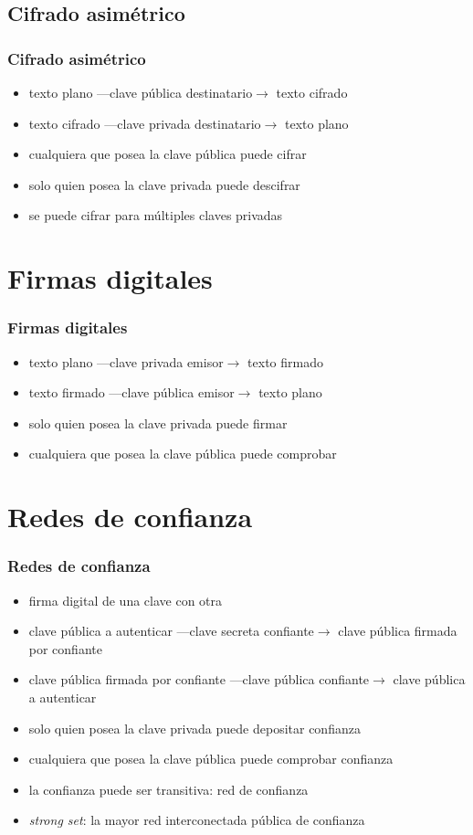 \documentclass{beamer}
\let\olditem\item
\renewcommand{\item}{%
\olditem\vspace{3pt}}
\begin{document}
\subsection{Cifrado asimétrico}
\begin{frame}
\frametitle{Cifrado asimétrico}
\begin{itemize}
    \item texto plano {\tiny ---clave pública destinatario$\rightarrow$} texto
        cifrado
    \item texto cifrado {\tiny ---clave privada destinatario$\rightarrow$} texto
        plano
    \item cualquiera que posea la clave pública puede cifrar
    \item solo quien posea la clave privada puede descifrar
    \item se puede cifrar para múltiples claves privadas
\end{itemize}
\end{frame}


\section{Firmas digitales}
\begin{frame}
\frametitle{Firmas digitales}
\begin{itemize}
    \item texto plano {\tiny ---clave privada emisor$\rightarrow$} texto firmado
    \item texto firmado {\tiny ---clave pública emisor$\rightarrow$} texto plano
    \item solo quien posea la clave privada puede firmar
    \item cualquiera que posea la clave pública puede comprobar
\end{itemize}
\end{frame}


\section{Redes de confianza}
\begin{frame}
\frametitle{Redes de confianza}
\begin{itemize}
    \item firma digital de una clave con otra
    \item clave pública a autenticar {\tiny ---clave secreta
        confiante$\rightarrow$} clave pública firmada por confiante
    \item clave pública firmada por confiante {\tiny ---clave pública
        confiante$\rightarrow$} clave pública a autenticar
    \item solo quien posea la clave privada puede depositar confianza
    \item cualquiera que posea la clave pública puede comprobar confianza
    \item la confianza puede ser transitiva: red de confianza
    \item \emph{strong set}: la mayor red interconectada pública de confianza
\end{itemize}
\end{frame}
\end{document}

